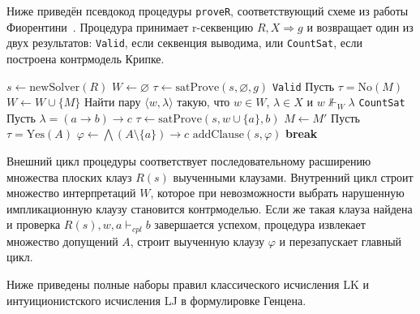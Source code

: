 \documentclass[14pt, russian]{scrartcl}
\begin{document}
\anonappendix
\label{app:prover}

Ниже приведён псевдокод процедуры \texttt{proveR}, соответствующий схеме из
работы Фиорентини~\cite{Fiorentini2021}. Процедура принимает r-секвенцию
$R, X \Rightarrow g$ и возвращает один из двух результатов: \texttt{Valid}, если
секвенция выводима, или \texttt{CountSat}, если построена контрмодель Крипке.

\begin{listing}[!htb]
\caption{Процедура \texttt{proveR} с перезапуском}
\label{alg:prover}
\begin{algorithmic}[1]
  \State $s \gets \mathrm{newSolver}(R)$
  \Loop
    \State $W \gets \varnothing$
    \State $\tau \gets \mathrm{satProve}(s, \varnothing, g)$
      \State \Return \texttt{Valid}
    \EndIf
    \State Пусть $\tau = \mathrm{No}(M)$
    \Loop
      \State $W \gets W \cup \{M\}$
      \State Найти пару $\langle w, \lambda\rangle$ такую, что
        $w \in W$, $\lambda \in X$ и $w \not\Vdash_W \lambda$
        \State \Return \texttt{CountSat}
      \EndIf
      \State Пусть $\lambda = (a \to b) \to c$
      \State $\tau \gets \mathrm{satProve}(s, w \cup \{a\}, b)$
        \State $M \gets M'$
      \Else
        \State Пусть $\tau = \mathrm{Yes}(A)$
        \State $\varphi \gets \bigwedge(A \setminus \{a\}) \to c$
        \State $\mathrm{addClause}(s, \varphi)$
        \State \textbf{break}
      \EndIf
    \EndLoop
  \EndLoop
\EndFunction
\end{algorithmic}
\end{listing}

Внешний цикл процедуры соответствует последовательному расширению множества
плоских клауз $R(s)$ выученными клауза\-ми. Внутренний цикл строит множество
интерпретаций $W$, которое при невозможности выбрать нарушенную импликационную
клаузу становится контрмоделью. Если же такая клауза найдена и проверка
$R(s), w, a \vdash_{\mathit{cpl}} b$ завершается успехом, процедура извлекает
множество допущений $A$, строит выученную клаузу $\varphi$ и перезапускает
главный цикл.

\anonappendix
\label{app:lk-lj-rules}

Ниже приведены полные наборы правил классического исчисления LK и
интуиционистского исчисления LJ в формулировке Генцена.
\end{document}
